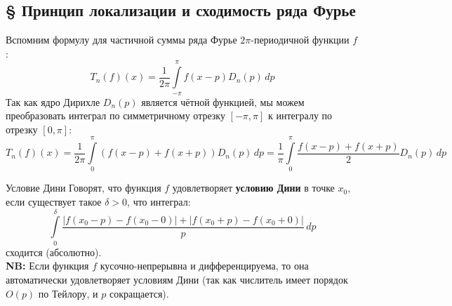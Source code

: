 \documentclass[12pt,a4paper]{article}
\begin{document}
\subsection{§ Принцип локализации и сходимость ряда Фурье}

Вспомним формулу для частичной суммы ряда Фурье $2\pi$-периодичной функции $f$:
$$ T_n(f)(x) = \frac{1}{2\pi} \int\limits_{-\pi}^\pi f(x-p) D_n(p) \, dp $$
Так как ядро Дирихле $D_n(p)$ является чётной функцией, мы можем преобразовать интеграл по симметричному отрезку $[-\pi, \pi]$ к интегралу по отрезку $[0, \pi]$:
$$ T_n(f)(x) = \frac{1}{2\pi} \int\limits_0^\pi \left( f(x-p) + f(x+p) \right) D_n(p) \, dp = \frac{1}{\pi} \int\limits_0^\pi \frac{f(x-p) + f(x+p)}{2} D_n(p) \, dp $$

\begin{center}
\end{center}

\begin{Definition}{Условие Дини}{}
Говорят, что функция $f$ удовлетворяет \textbf{условию Дини} в точке $x_0$, если существует такое $\delta > 0$, что интеграл:
$$ \int\limits_0^\delta \frac{|f(x_0-p) - f(x_0-0)| + |f(x_0+p) - f(x_0+0)|}{p} \, dp $$
сходится (абсолютно). \\
\textbf{NB:} Если функция $f$ кусочно-непрерывна и дифференцируема, то она автоматически удовлетворяет условиям Дини (так как числитель имеет порядок $O(p)$ по Тейлору, и $p$ сокращается).
\end{Definition}
\end{document}
